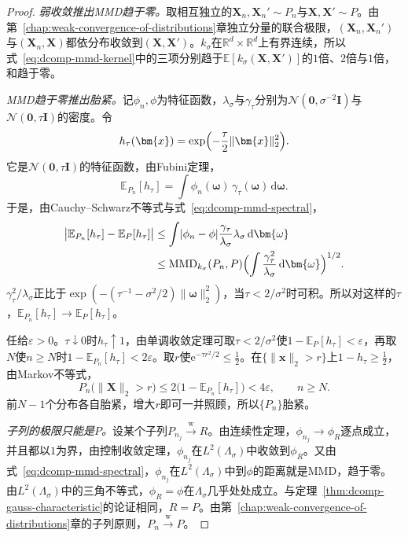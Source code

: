 \begin{proof}
\emph{弱收敛推出MMD趋于零。}取相互独立的$\bm{X}_n,\bm{X}_n'\sim P_n$与$\bm{X},\bm{X}'\sim P$。由第~\ref{chap:weak-convergence-of-distributions}章独立分量的联合极限，$(\bm{X}_n,\bm{X}_n')$与$(\bm{X}_n,\bm{X})$都依分布收敛到$(\bm{X},\bm{X}')$。$k_\sigma$在$\mathbb{R}^{d}\times\mathbb{R}^{d}$上有界连续，所以式~\eqref{eq:dcomp-mmd-kernel}中的三项分别趋于$\mathbb{E}[k_\sigma(\bm{X},\bm{X}')]$的$1$倍、$2$倍与$1$倍，和趋于零。

\emph{MMD趋于零推出胎紧。}记$\phi_n,\phi$为特征函数，$\lambda_\sigma$与$\gamma_\tau$分别为$\mathcal{N}(\bm{0},\sigma^{-2}\bm{I})$与$\mathcal{N}(\bm{0},\tau\bm{I})$的密度。令
\[
 h_\tau(\bm{x})=\exp\Bigl(-\frac{\tau}{2}\lVert\bm{x}\rVert_2^{2}\Bigr) .
\]
它是$\mathcal{N}(\bm{0},\tau\bm{I})$的特征函数，由Fubini定理，
\[
 \mathbb{E}_{P_n}[h_\tau]=\int\phi_n(\bm{\omega})\,\gamma_\tau(\bm{\omega})\,\mathrm{d}\bm{\omega} .
\]
于是，由Cauchy--Schwarz不等式与式~\eqref{eq:dcomp-mmd-spectral}，
\[
 \begin{aligned}
 \bigl\lvert\mathbb{E}_{P_n}[h_\tau]-\mathbb{E}_{P}[h_\tau]\bigr\rvert&\leq\int\lvert\phi_n-\phi\rvert\frac{\gamma_\tau}{\lambda_\sigma}\lambda_\sigma\,\mathrm{d}\bm{\omega}\\
 &\leq\operatorname{MMD}_{k_\sigma}(P_n,P)\Bigl(\int\frac{\gamma_\tau^{2}}{\lambda_\sigma}\,\mathrm{d}\bm{\omega}\Bigr)^{1/2} .
 \end{aligned}
\]
$\gamma_\tau^{2}/\lambda_\sigma$正比于$\exp(-(\tau^{-1}-\sigma^{2}/2)\lVert\bm{\omega}\rVert_2^{2})$，当$\tau<2/\sigma^{2}$时可积。所以对这样的$\tau$，$\mathbb{E}_{P_n}[h_\tau]\to\mathbb{E}_{P}[h_\tau]$。

任给$\varepsilon>0$。$\tau\downarrow0$时$h_\tau\uparrow1$，由单调收敛定理可取$\tau<2/\sigma^{2}$使$1-\mathbb{E}_{P}[h_\tau]<\varepsilon$，再取$N$使$n\geq N$时$1-\mathbb{E}_{P_n}[h_\tau]<2\varepsilon$。取$r$使$\mathrm{e}^{-\tau r^{2}/2}\leq\tfrac12$。在$\{\lVert\bm{x}\rVert_2>r\}$上$1-h_\tau\geq\tfrac12$，由Markov不等式，
\[
 P_n\bigl(\lVert\bm{X}\rVert_2>r\bigr)\leq2\bigl(1-\mathbb{E}_{P_n}[h_\tau]\bigr)<4\varepsilon,\qquad n\geq N .
\]
前$N-1$个分布各自胎紧，增大$r$即可一并照顾，所以$\{P_n\}$胎紧。

\emph{子列的极限只能是$P$。}设某个子列$P_{n_j}\xrightarrow{\mathrm{w}}R$。由连续性定理，$\phi_{n_j}\to\phi_R$逐点成立，并且都以$1$为界，由控制收敛定理，$\phi_{n_j}$在$L^{2}(\Lambda_\sigma)$中收敛到$\phi_R$。又由式~\eqref{eq:dcomp-mmd-spectral}，$\phi_{n_j}$在$L^{2}(\Lambda_\sigma)$中到$\phi$的距离就是MMD，趋于零。由$L^{2}(\Lambda_\sigma)$中的三角不等式，$\phi_R=\phi$在$\Lambda_\sigma$几乎处处成立。与定理~\ref{thm:dcomp-gauss-characteristic}的论证相同，$R=P$。由第~\ref{chap:weak-convergence-of-distributions}章的子列原则，$P_n\xrightarrow{\mathrm{w}}P$。
\end{proof}

